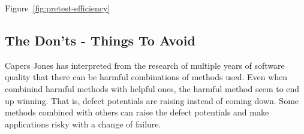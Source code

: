 Figure~\ref{fig:pretest-efficiency}


 
 



\subsection{The Don'ts - Things To Avoid}
 
 
 


Capers Jones has interpreted from the research of multiple years of software quality that there can be harmful combinations of methods used. Even when combinind harmful methods with helpful ones, the harmful method seem to end up winning. That is, defect potentials are raising instead of coming down. Some methods combined with others can raise the defect potentials and make applications risky with a change of failure.
